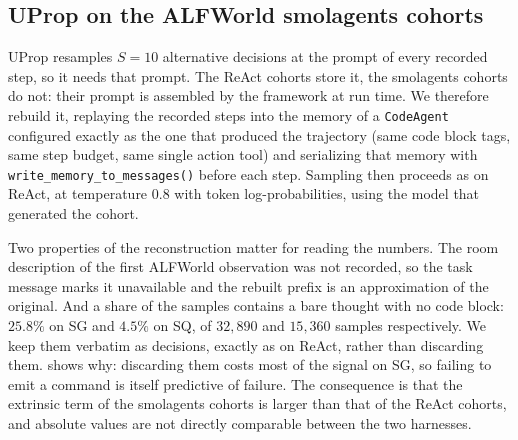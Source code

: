 
\subsection{UProp on the ALFWorld smolagents cohorts}
\label{app:uprop-smolagents}

UProp resamples $S=10$ alternative decisions at the prompt of every recorded step, so it needs
that prompt. The ReAct cohorts store it, the smolagents cohorts do not: their prompt is assembled
by the framework at run time. We therefore rebuild it, replaying the recorded steps into the memory
of a \texttt{CodeAgent} configured exactly as the one that produced the trajectory (same code block
tags, same step budget, same single action tool) and serializing that memory with
\texttt{write\_memory\_to\_messages()} before each step. Sampling then proceeds as on ReAct, at
temperature $0.8$ with token log-probabilities, using the model that generated the cohort.

Two properties of the reconstruction matter for reading the numbers. The room description of the
first ALFWorld observation was not recorded, so the task message marks it unavailable and the
rebuilt prefix is an approximation of the original. And a share of the samples contains a bare
thought with no code block: $25.8\%$ on SG and $4.5\%$ on SQ, of $32{,}890$ and $15{,}360$ samples
respectively. We keep them verbatim as decisions, exactly as on ReAct, rather than discarding them.
 shows why: discarding them costs most of the signal on SG, so
failing to emit a command is itself predictive of failure. The consequence is that the extrinsic
term of the smolagents cohorts is larger than that of the ReAct cohorts, and absolute values are
not directly comparable between the two harnesses.

